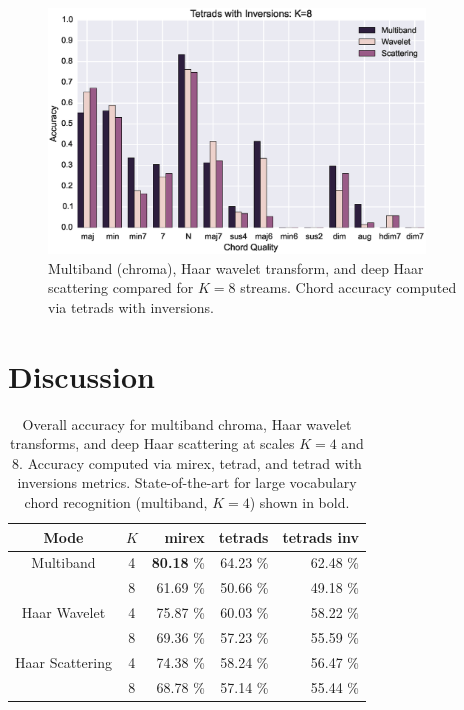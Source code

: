 \documentclass{article}
\begin{document}
\begin{figure}
 \centerline{
 \includegraphics[width=10cm]{figs/tetrad_inv8.eps}}
 \caption{Multiband (chroma), Haar wavelet transform, and deep Haar scattering compared for $K=8$ streams. Chord accuracy computed via tetrads with inversions.}
 \label{fig:tetrad8}
\end{figure}
	

\section{Discussion}\label{sec:discussion}

\begin{table}[t]
	\begin{center}
	\begin{tabular} {| c | c | r | r | r |}
	\hline
	Mode & $K$ & mirex & tetrads & tetrads inv \\
	\hline
	Multiband & 4 & \textbf{80.18} \% & 64.23 \% & 62.48 \% \\
	& 8 & 61.69 \% & 50.66 \% & 49.18 \% \\
	
	Haar Wavelet & 4 & 75.87 \% & 60.03 \% & 58.22 \%\\
	 & 8 & 69.36 \% & 57.23 \% & 55.59 \% \\
	 
	 Haar Scattering & 4 & 74.38 \% & 58.24 \% & 56.47 \% \\
	  & 8 & 68.78 \% & 57.14 \% & 55.44 \% \\
	\hline
	\end{tabular}
	\end{center}
	\protect\caption{Overall accuracy for multiband chroma, Haar wavelet transforms, and deep Haar scattering at scales $K=4$ and $8$. Accuracy computed via mirex, tetrad, and tetrad with inversions 	metrics. State-of-the-art for large vocabulary chord recognition (multiband, $K=4$) shown in 		bold. 
	\label{table:overall-scores}}
\end{table}
\end{document}

